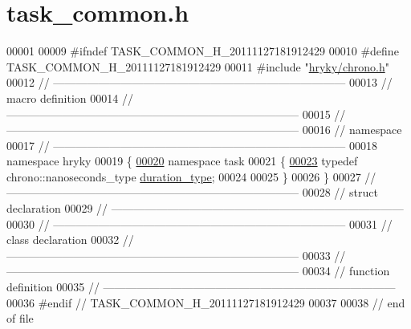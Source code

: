 \hypertarget{task__common_8h_source}{\section{task\-\_\-common.\-h}
}

\begin{DoxyCode}
00001 
00009 \textcolor{preprocessor}{#ifndef TASK\_COMMON\_H\_20111127181912429}
00010 \textcolor{preprocessor}{}\textcolor{preprocessor}{#define TASK\_COMMON\_H\_20111127181912429}
00011 \textcolor{preprocessor}{}\textcolor{preprocessor}{#include "\hyperlink{chrono_8h}{hryky/chrono.h}"}
00012 \textcolor{comment}{//
      ------------------------------------------------------------------------------}
00013 \textcolor{comment}{// macro definition}
00014 \textcolor{comment}{//
      ------------------------------------------------------------------------------}
00015 \textcolor{comment}{//
      ------------------------------------------------------------------------------}
00016 \textcolor{comment}{// namespace}
00017 \textcolor{comment}{//
      ------------------------------------------------------------------------------}
00018 \textcolor{keyword}{namespace }hryky
00019 \{
\hypertarget{task__common_8h_source_l00020}{}\hyperlink{namespacehryky_1_1task}{00020} \textcolor{keyword}{namespace }task
00021 \{
\hypertarget{task__common_8h_source_l00023}{}\hyperlink{namespacehryky_1_1task_ab22f4f47e2ef029ecd5373ffbaba40cf}{00023}     \textcolor{keyword}{typedef} chrono::nanoseconds\_type \hyperlink{namespacehryky_1_1task_ab22f4f47e2ef029ecd5373ffbaba40cf}{duration_type};
00024 
00025 \}
00026 \}
00027 \textcolor{comment}{//
      ------------------------------------------------------------------------------}
00028 \textcolor{comment}{// struct declaration}
00029 \textcolor{comment}{//
      ------------------------------------------------------------------------------}
00030 \textcolor{comment}{//
      ------------------------------------------------------------------------------}
00031 \textcolor{comment}{// class declaration}
00032 \textcolor{comment}{//
      ------------------------------------------------------------------------------}
00033 \textcolor{comment}{//
      ------------------------------------------------------------------------------}
00034 \textcolor{comment}{// function definition}
00035 \textcolor{comment}{//
      ------------------------------------------------------------------------------}
00036 \textcolor{preprocessor}{#endif // TASK\_COMMON\_H\_20111127181912429}
00037 \textcolor{preprocessor}{}
00038 \textcolor{comment}{// end of file}
\end{DoxyCode}
